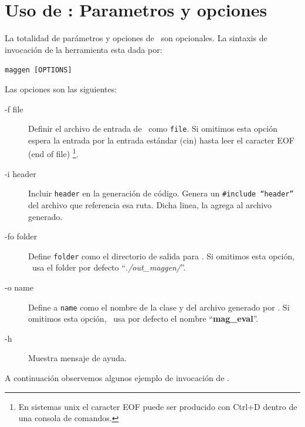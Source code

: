 \section{Uso de \maggen: Parametros y opciones}
\label{sec:uso-maggen}
La totalidad de parámetros y opciones de \maggen\ son opcionales. La sintaxis de invocación de la herramienta esta dada por:\\
\begin{center}\texttt{maggen [OPTIONS]}\end{center}
Las opciones son las siguientes:
\begin{description}
\item [-f  file] Definir el archivo de entrada de \maggen\ como \texttt{file}. Si omitimos esta opción \maggen espera la entrada por la entrada estándar (cin) hasta leer el caracter EOF (end of file) \footnote{En sistemas unix el caracter EOF puede ser producido con Ctrl+D dentro de una consola de comandos.}.
\item [-i  header] Incluir \texttt{header} en la generación de código. Genera un \texttt{\#include ``header''} del archivo que referencia esa ruta. Dicha linea, \maggen la agrega al archivo generado.
\item [-fo folder] Define \texttt{folder} como el directorio de salida para \maggen. Si omitimos esta opción, \maggen\ usa el folder por defecto ``\textit{./out\_maggen/}''.
\item [-o  name] Define a \texttt{name} como el nombre de la clase y del archivo generado por \maggen. Si omitimos esta opción, \maggen\ usa por defecto el nombre ``\textbf{mag\_eval}''.
\item [-h] Muestra mensaje de ayuda.
\end{description}
A continuación observemos algunos ejemplo de invocación de \maggen.
